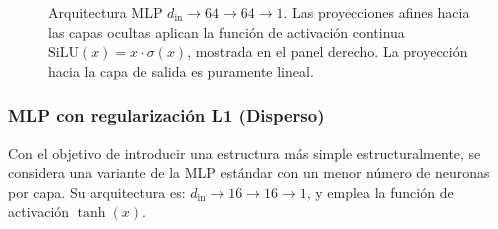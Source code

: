 \documentclass[11pt, a4paper]{article}
\begin{document}
\begin{figure}[h]
    \shorthandon{>}
    \caption{Arquitectura MLP $d_{\text{in}} \rightarrow 64 \rightarrow 64 \rightarrow 1$. Las proyecciones afines hacia las capas ocultas aplican la función de activación continua $\text{SiLU}(x) = x \cdot \sigma(x)$, mostrada en el panel derecho. La proyección hacia la capa de salida es puramente lineal.}
    \label{fig:mlp_standard}
\end{figure}



\subsubsection{MLP con regularización L1 (Disperso)}

Con el objetivo de introducir una estructura más simple estructuralmente, se considera una variante de la MLP estándar con un menor número de neuronas por capa. Su arquitectura es: $d_{\text{in}} \rightarrow 16 \rightarrow 16 \rightarrow 1$, y emplea la función de activación $\tanh (x)$. 
\end{document}
